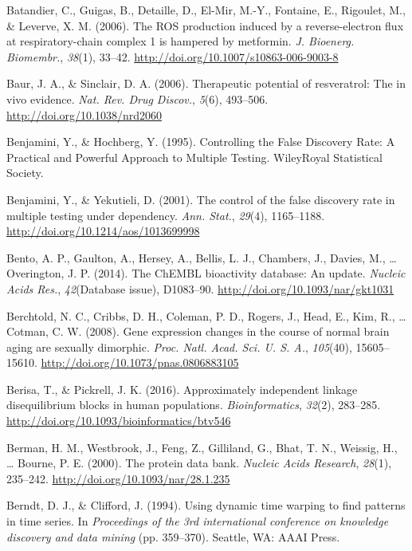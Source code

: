 \documentclass[12pt,twoside]{unicam}
\begin{document}
\begin{cslreferences}
\leavevmode\hypertarget{ref-Batandier2006}{}%
Batandier, C., Guigas, B., Detaille, D., El-Mir, M.-Y., Fontaine, E., Rigoulet, M., \& Leverve, X. M. (2006). The ROS production induced by a reverse-electron flux at respiratory-chain complex 1 is hampered by metformin. \emph{J. Bioenerg. Biomembr.}, \emph{38}(1), 33--42. \url{http://doi.org/10.1007/s10863-006-9003-8}

\leavevmode\hypertarget{ref-Baur2006}{}%
Baur, J. A., \& Sinclair, D. A. (2006). Therapeutic potential of resveratrol: The in vivo evidence. \emph{Nat. Rev. Drug Discov.}, \emph{5}(6), 493--506. \url{http://doi.org/10.1038/nrd2060}

\leavevmode\hypertarget{ref-Benjamini1995}{}%
Benjamini, Y., \& Hochberg, Y. (1995). Controlling the False Discovery Rate: A Practical and Powerful Approach to Multiple Testing. WileyRoyal Statistical Society.

\leavevmode\hypertarget{ref-Benjamini2001}{}%
Benjamini, Y., \& Yekutieli, D. (2001). The control of the false discovery rate in multiple testing under dependency. \emph{Ann. Stat.}, \emph{29}(4), 1165--1188. \url{http://doi.org/10.1214/aos/1013699998}

\leavevmode\hypertarget{ref-Bento2014}{}%
Bento, A. P., Gaulton, A., Hersey, A., Bellis, L. J., Chambers, J., Davies, M., \ldots{} Overington, J. P. (2014). The ChEMBL bioactivity database: An update. \emph{Nucleic Acids Res.}, \emph{42}(Database issue), D1083--90. \url{http://doi.org/10.1093/nar/gkt1031}

\leavevmode\hypertarget{ref-Berchtold2008}{}%
Berchtold, N. C., Cribbs, D. H., Coleman, P. D., Rogers, J., Head, E., Kim, R., \ldots{} Cotman, C. W. (2008). Gene expression changes in the course of normal brain aging are sexually dimorphic. \emph{Proc. Natl. Acad. Sci. U. S. A.}, \emph{105}(40), 15605--15610. \url{http://doi.org/10.1073/pnas.0806883105}

\leavevmode\hypertarget{ref-Berisa2016}{}%
Berisa, T., \& Pickrell, J. K. (2016). Approximately independent linkage disequilibrium blocks in human populations. \emph{Bioinformatics}, \emph{32}(2), 283--285. \url{http://doi.org/10.1093/bioinformatics/btv546}

\leavevmode\hypertarget{ref-Berman2000}{}%
Berman, H. M., Westbrook, J., Feng, Z., Gilliland, G., Bhat, T. N., Weissig, H., \ldots{} Bourne, P. E. (2000). The protein data bank. \emph{Nucleic Acids Research}, \emph{28}(1), 235--242. \url{http://doi.org/10.1093/nar/28.1.235}

\leavevmode\hypertarget{ref-Berndt1994}{}%
Berndt, D. J., \& Clifford, J. (1994). Using dynamic time warping to find patterns in time series. In \emph{Proceedings of the 3rd international conference on knowledge discovery and data mining} (pp. 359--370). Seattle, WA: AAAI Press.


\end{cslreferences}
\end{document}
